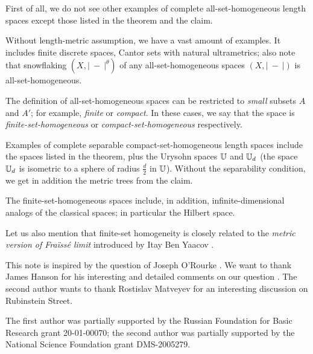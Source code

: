 \documentclass[a4paper,10pt]{article}
\begin{document}
First of all, we do not see other examples of complete all-set-homogeneous length spaces except those listed in the theorem and the claim.

Without length-metric assumption, we have a vast amount of examples.
It includes finite discrete spaces, Cantor sets with natural ultrametrics;
also note that snowflaking $(X,|\ -\ |^\theta)$ of any all-set-homogeneous spaces $(X,|\ -\ |)$ is all-set-homogeneous.

The definition of all-set-homogeneous spaces can be restricted to \emph{small} subsets $A$ and $A'$; for example, \emph{finite} or \emph{compact}.
In these cases, we say that the space is \emph{finite-set-homogeneous} or \emph{compact-set-homogeneous} respectively.

Examples of complete separable compact-set-homogeneous length spaces include the spaces listed in the theorem,
plus the Urysohn spaces $\mathbb{U}$ and $\mathbb{U}_d$ (the space $\mathbb{U}_d$ is isometric to a sphere of radius $\tfrac d2$ in $\mathbb{U}$).
Without the separability condition, we get in addition the metric trees from the claim.

The finite-set-homogeneous spaces include, in addition, infinite-dimensional analogs of the classical spaces;
in particular the Hilbert space.  

Let us also mention that finite-set homogeneity is closely related to the \emph{metric version of Fraïssé limit} introduced by Itay Ben Yaacov \cite{ben-yaacov}. 

This note is inspired by the question of Joseph O'Rourke \cite{rourke}.
We want to thank James Hanson for his interesting and detailed comments on our question \cite{hanson}.
The second author wants to thank Rostislav Matveyev for an interesting discussion on Rubinstein Street. 

The first author was partially supported by the Russian Foundation for Basic Research grant 20-01-00070; the second author was partially supported by the National Science Foundation grant DMS-2005279.

{\sloppy
\printbibliography[heading=bibintoc]
\fussy
}
\end{document}
